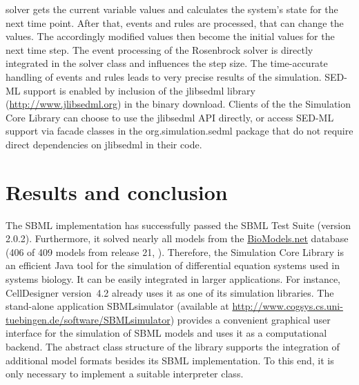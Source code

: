 \documentclass{bioinfo}
\begin{document}
\begin{methods}
solver gets the current variable values and
calculates the system's state for the next time point. After that, events
and rules are processed, that can change the values. The accordingly modified
values then become the initial values for the next time step. The event processing of the
Rosenbrock solver 
is directly integrated in the solver class and influences the
step size. The time-accurate handling of events and rules leads to very precise
results of the simulation.
%
SED-ML support is enabled by inclusion of the jlibsedml library
(\href{http://www.jlibsedml.org}{http://www.jlibsedml.org}) in the binary
download. Clients of the the Simulation Core Library can choose to use the
jlibsedml API directly, or access SED-ML support via  facade classes in the
org.simulation.sedml package that do not require direct dependencies on
jlibsedml in their code.
\end{methods}



%
%

\section{Results and conclusion}
The SBML implementation has successfully passed the
SBML Test Suite (version 2.0.2).
Furthermore, it solved nearly all models from the
\href{http://biomodels.net}{BioModels.net} database (406 of 409 models from
release 21, \citealp{Novere2006a}).
Therefore, the Simulation Core Library is an efficient Java tool for the
simulation of differential equation systems used in systems biology. It can be
easily integrated in larger applications. For instance,
CellDesigner version~4.2 \citep{Funahashi2003} already uses it as one of its simulation libraries.
The stand-alone application SBMLsimulator (available at
\href{http://www.cogsys.cs.uni-tuebingen.de/software/SBMLsimulator}{http://www.cogsys.cs.uni-tuebingen.de/software/SBMLsimulator})
provides a convenient graphical user interface for the simulation of SBML
models and uses it as a computational backend.
The abstract class structure of the library supports the integration of
additional model formats besides its SBML implementation. To this end, it is
only necessary to implement a suitable interpreter class.
\end{document}
